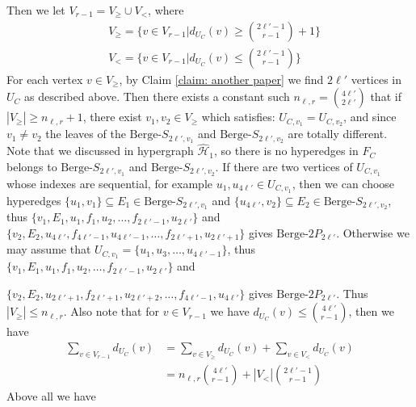 \documentclass[12pt]{article}%
\newcommand{\ber}{\text{Berge-}}
\newcommand{\mh}{\mathcal{H}}
\begin{document}
\iffalse
Then we let $V_{r-1}=V_{\geq}\cup V_{<}$, where
\begin{equation*}
    \begin{aligned}
        &V_{\geq }=\{v\in V_{r-1}|d_{U_{C}}(v)\geq \binom{2\ell'-1}{r-1}+1\}\\
        &V_{< }=\{v\in V_{r-1}|d_{U_{C}}(v)\leq \binom{2\ell'-1}{r-1}\}
    \end{aligned}
\end{equation*}
For each vertex $v\in V_{\geq}$, by Claim \ref{claim: another paper} we find $2\ell'$ vertices in $U_{C}$ as described above. Then there exists a constant such $n_{\ell,r}=\binom{4\ell'}{2\ell'}$ that if $|V_{\geq}|\geq n_{\ell,r}+1$, there exist $v_{1},v_{2}\in V_{\geq}$ which satisfies: $U_{C,v_1}=U_{C,v_2}$, and since $v_1\neq v_2$ the leaves of the $\ber S_{2\ell',v_1}$ and $\ber S_{2\ell',v_2}$ are totally different. Note that we discussed in hypergraph $\hat{\mh}_{1}$, so there is no hyperedges in $F_{C}$ belongs to $\ber S_{2\ell',v_1}$ and $\ber S_{2\ell',v_2}$. If there are two vertices of $U_{C,v_1}$ whose indexes are sequential, for example $u_{1},u_{4\ell'}\in U_{C,v_1}$, then we can choose hyperedges $\{u_1,v_1\}\subseteq E_{1}\in \ber S_{2\ell',v_1}$ and $\{u_{4\ell'},v_2\}\subseteq E_{2}\in \ber S_{2\ell',v_2}$, thus $\{v_1,E_1,u_{1},f_1,u_{2}, \ldots,f_{2\ell'-1},u_{2\ell'}\}$ and $\{v_2,E_2,u_{4\ell'},f_{4\ell'-1},u_{4\ell'-1},\ldots,f_{2\ell'+1},u_{2\ell'+1}\}$ gives $\ber 2P_{2\ell'}$. Otherwise we may assume that $U_{C,v_1}=\{u_{1},u_{3},\ldots,u_{4\ell'-1}\}$, thus $\{v_1,E_1,u_{1},f_{1},u_{2}, \ldots,f_{2\ell'-1},u_{2\ell'}\}$ and
\par\noindent
$\{v_2,E_2,u_{2\ell'+1},f_{2\ell'+1},u_{2\ell'+2},\ldots,f_{4\ell'-1},u_{4\ell'}\}$ gives $\ber 2P_{2\ell'}$. Thus $|V_{\geq}|\leq n_{\ell,r}$. Also note that for $v\in V_{r-1}$ we have $d_{U_{C}}(v)\leq \binom{4\ell'}{r-1}$, then we have
\begin{equation*}
    \begin{aligned}
        \sum_{v\in V_{r-1}}d_{U_{C}}(v)&=\sum_{v\in V_{\geq}}d_{U_{C}}(v)+\sum_{v\in V_{<}}d_{U_{C}}(v)\\
        &=n_{\ell,r}\binom{4\ell'}{r-1}+|V_{<}|\binom{2\ell'-1}{r-1}
    \end{aligned}
\end{equation*}
Above all we have
\end{document}
